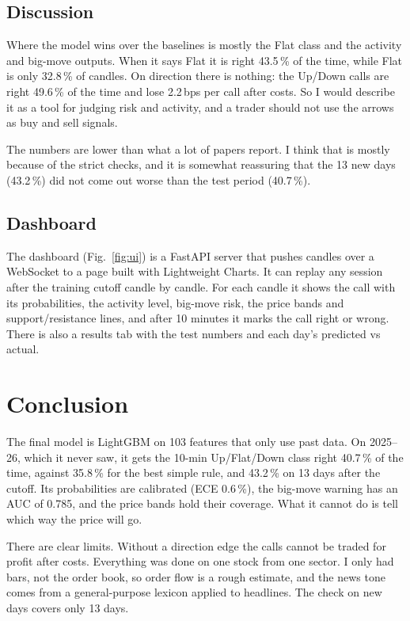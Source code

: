 \documentclass[11pt,a4paper]{article}
\begin{document}
\subsection{Discussion}
Where the model wins over the baselines is mostly the Flat class and the activity and big-move outputs. When it
says Flat it is right 43.5\,\% of the time, while Flat is only 32.8\,\% of candles. On direction there is nothing:
the Up/Down calls are right 49.6\,\% of the time and lose 2.2\,bps per call after costs. So I would describe it as a
tool for judging risk and activity, and a trader should not use the arrows as buy and sell signals.

The numbers are lower than what a lot of papers report. I think that is mostly because of the strict checks, and it
is somewhat reassuring that the 13 new days (43.2\,\%) did not come out worse than the test period (40.7\,\%).

\subsection{Dashboard}
The dashboard (Fig.~\ref{fig:ui}) is a FastAPI server that pushes candles over a WebSocket to a page built with
Lightweight Charts. It can replay any session after the training cutoff candle by candle. For each candle it shows
the call with its probabilities, the activity level, big-move risk, the price bands and support/resistance lines, and
after 10 minutes it marks the call right or wrong. There is also a results tab with the test numbers and each day's
predicted vs actual.

\section{Conclusion}
The final model is LightGBM on 103 features that only use past data. On 2025--26, which it never saw, it gets the
10-min Up/Flat/Down class right 40.7\,\% of the time, against 35.8\,\% for the best simple rule, and 43.2\,\% on 13
days after the cutoff. Its probabilities are calibrated (ECE 0.6\,\%), the big-move warning has an AUC of 0.785, and
the price bands hold their coverage. What it cannot do is tell which way the price will go.

There are clear limits. Without a direction edge the calls cannot be traded for profit after costs. Everything was
done on one stock from one sector. I only had bars, not the order book, so order flow is a rough estimate, and the
news tone comes from a general-purpose lexicon applied to headlines. The check on new days covers only 13 days.
\end{document}
